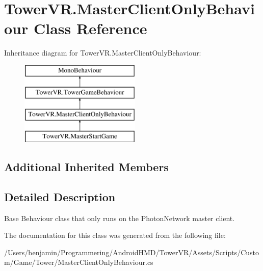 \hypertarget{class_tower_v_r_1_1_master_client_only_behaviour}{}\section{Tower\+V\+R.\+Master\+Client\+Only\+Behaviour Class Reference}
\label{class_tower_v_r_1_1_master_client_only_behaviour}
Inheritance diagram for Tower\+V\+R.\+Master\+Client\+Only\+Behaviour\+:\begin{figure}[H]
\begin{center}
\leavevmode
\includegraphics[height=4.000000cm]{class_tower_v_r_1_1_master_client_only_behaviour}
\end{center}
\end{figure}
\subsection*{Additional Inherited Members}


\subsection{Detailed Description}
Base Behaviour class that only runs on the Photon\+Network master client. 

The documentation for this class was generated from the following file\+:\begin{DoxyCompactItemize}
\item 
/\+Users/benjamin/\+Programmering/\+Android\+H\+M\+D/\+Tower\+V\+R/\+Assets/\+Scripts/\+Custom/\+Game/\+Tower/Master\+Client\+Only\+Behaviour.\+cs\end{DoxyCompactItemize}

